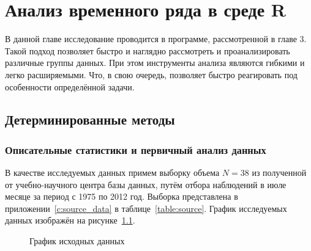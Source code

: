 
\newcommand{\inp}[1]{}
\newcommand{\characteristic}[2]{\inp{#1/characteristics/#2}}
\newcommand{\descriptive}[2]{\inp{#1/descriptive/#2}}
\newcommand{\test}[3]{\inp{#1/test/#2/#3}}
\newcommand{\normaldistr}{$\mathcal{N}(\descriptive{original}{mean}, \descriptive{original}{variance})$}
\newcommand{\resnormaldistr}{$\mathcal{N}(\descriptive{residual}{mean}, \descriptive{residual}{variance})$}

\newpage

\chapter{Анализ временного ряда в среде R}

В данной главе исследование проводится в программе, рассмотренной в главе 3. Такой подход позволяет быстро и наглядно рассмотреть и проанализировать различные группы данных. При этом инструменты анализа являются гибкими и легко расширяемыми. Что, в свою очередь, позволяет быстро реагировать под особенности определённой задачи.

\section{Детерминированные методы} %
\label{sec:determenistic}

\subsection{Описательные статистики и первичный анализ данных} %
\label{sec:basis}

В качестве исследуемых данных примем выборку объема $ N = 38 $ из полученной от учебно-научного центра базы данных, путём отбора наблюдений в июле месяце за период с 1975 по 2012 год. Выборка представлена в приложении~\ref{c:source_data} в таблице~\ref{table:source}. График исследуемых данных изображён на рисунке~\ref{img:input}.
\begin{figure}[ht]
\caption{График исходных данных}
\label{img:input}
\end{figure}

